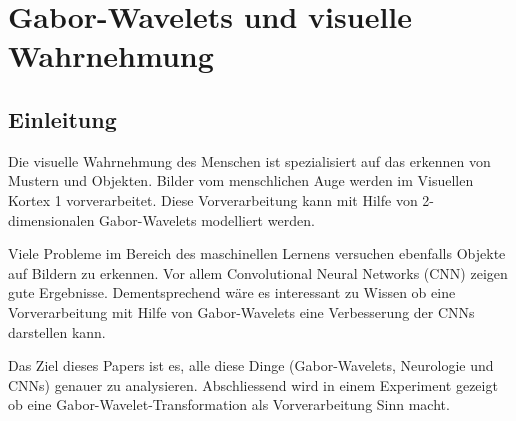 %
%
%
\chapter{Gabor-Wavelets und visuelle Wahrnehmung\label{chapter:visuell}}
\begin{refsection}

\section{Einleitung}

Die visuelle Wahrnehmung des Menschen ist spezialisiert auf das erkennen von Mustern und Objekten.
Bilder vom menschlichen Auge werden im Visuellen Kortex 1 vorverarbeitet.
Diese Vorverarbeitung kann mit Hilfe von 2-dimensionalen Gabor-Wavelets modelliert werden.

Viele Probleme im Bereich des maschinellen Lernens versuchen ebenfalls Objekte auf Bildern zu erkennen.
Vor allem Convolutional Neural Networks (CNN) zeigen gute Ergebnisse.
Dementsprechend wäre es interessant zu Wissen ob eine Vorverarbeitung mit Hilfe von Gabor-Wavelets eine Verbesserung der CNNs darstellen kann.

Das Ziel dieses Papers ist es, alle diese Dinge (Gabor-Wavelets, Neurologie und CNNs) genauer zu analysieren.
Abschliessend wird in einem Experiment gezeigt ob eine Gabor-Wavelet-Transformation als Vorverarbeitung Sinn macht.








\printbibliography[heading=subbibliography]
\end{refsection}
